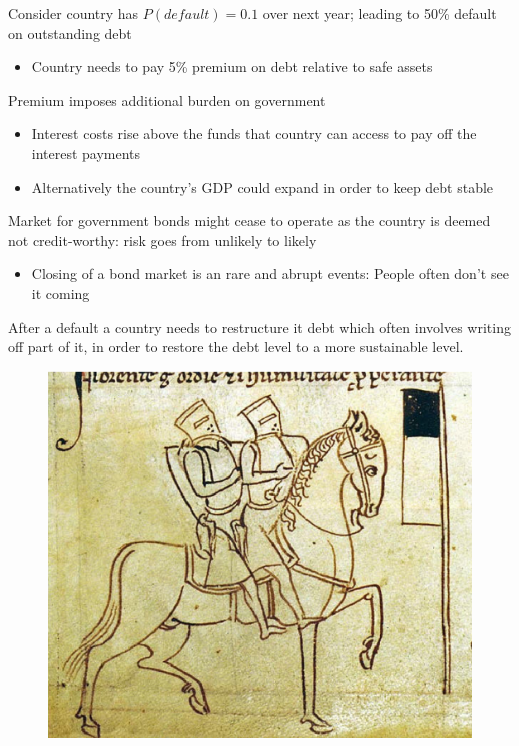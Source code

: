 \documentclass{beamer}
\begin{document}
\begin{frame}
  Consider country has $P(default)=0.1$ over next year; leading to 50\% default on outstanding debt
  \begin{itemize}
    \item Country needs to pay 5\% premium on debt relative to safe assets
  \end{itemize}
  \medskip
  Premium imposes additional burden on government
  \begin{itemize}
    \item Interest costs rise above the funds that country can access to pay off the interest payments
    \item Alternatively the country's GDP could expand in order to keep debt stable
  \end{itemize}
  Market for government bonds might cease to operate as the country is deemed not credit-worthy: risk goes from unlikely to likely
  \begin{itemize}
    \item Closing of a bond market is an rare and abrupt events: People often don't see it coming
  \end{itemize}
  After a default a country needs to restructure it debt which often involves writing off part of it, in order to restore the debt level to a more sustainable level. 
\end{frame}

\begin{frame}
  \begin{figure}
    \includegraphics[scale=.4]{templars.eps}
  \end{figure}
\end{frame}
\end{document}
